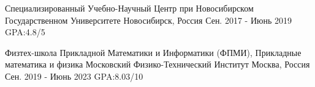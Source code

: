 

\begin{cventries}

  \cventry
    {} %
    {Специализированный Учебно-Научный Центр при Новосибирском Государственном Университете} %
    {Новосибирск, Россия} %
    {Сен. 2017 - Июнь 2019} %
    {
      GPA:4.8/5
    }

    \cventry
    {Физтех-школа Прикладной Математики и Информатики (ФПМИ), Прикладные математика и физика} %
    {Московский Физико-Технический Институт} %
    {Москва, Россия} %
    {Сен. 2019 - Июнь 2023} %
    {
        GPA:8.03/10
    }

\end{cventries}
